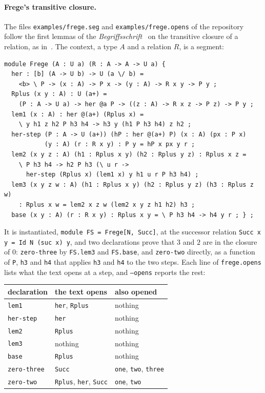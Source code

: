 \documentclass[11pt]{article}
\newcommand{\kw}[1]{\texttt{#1}}
\begin{document}
\paragraph{Frege's transitive closure.} The files
\texttt{examples/frege.seg} and \texttt{examples/frege.opens} of the
repository follow the first lemmas of the
\emph{Begriffsschrift}~\cite{Frege} on the transitive closure of a
relation, as in~\cite[\S2.4.3]{Rem}. The context, a type $A$ and a
relation $R$, is a segment:
\begin{verbatim}
module Frege (A : U a) (R : A -> A -> U a) {
  her : [b] (A -> U b) -> U (a \/ b) =
    <b> \ P -> (x : A) -> P x -> (y : A) -> R x y -> P y ;
  Rplus (x y : A) : U (a+) =
    (P : A -> U a) -> her @a P -> ((z : A) -> R x z -> P z) -> P y ;
  lem1 (x : A) : her @(a+) (Rplus x) =
    \ y h1 z h2 P h3 h4 -> h3 y (h1 P h3 h4) z h2 ;
  her-step (P : A -> U (a+)) (hP : her @(a+) P) (x : A) (px : P x)
           (y : A) (r : R x y) : P y = hP x px y r ;
  lem2 (x y z : A) (h1 : Rplus x y) (h2 : Rplus y z) : Rplus x z =
    \ P h3 h4 -> h2 P h3 (\ u r ->
      her-step (Rplus x) (lem1 x) y h1 u r P h3 h4) ;
  lem3 (x y z w : A) (h1 : Rplus x y) (h2 : Rplus y z) (h3 : Rplus z w)
    : Rplus x w = lem2 x z w (lem2 x y z h1 h2) h3 ;
  base (x y : A) (r : R x y) : Rplus x y = \ P h3 h4 -> h4 y r ; } ;
\end{verbatim}
It is instantiated, \kw{module FS = Frege[N, Succ]}, at the successor
relation \kw{Succ x y = Id N (suc x) y}, and two declarations prove that
$3$ and $2$ are in the closure of $0$: \kw{zero-three} by
\kw{FS.lem3} and \kw{FS.base}, and \kw{zero-two} directly, as a
function of \kw{P}, \kw{h3} and \kw{h4} that applies \kw{h3} and
\kw{h4} to the two steps.
Each line of \texttt{frege.opens} lists what the text opens at a step,
and \kw{--opens} reports the rest:
\begin{center}
\begin{tabular}{lll}
\toprule
declaration & the text opens & also opened\\
\midrule
\kw{lem1} & \kw{her}, \kw{Rplus} & nothing\\
\kw{her-step} & \kw{her} & nothing\\
\kw{lem2} & \kw{Rplus} & nothing\\
\kw{lem3} & nothing & nothing\\
\kw{base} & \kw{Rplus} & nothing\\
\kw{zero-three} & \kw{Succ} & \kw{one}, \kw{two}, \kw{three}\\
\kw{zero-two} & \kw{Rplus}, \kw{her}, \kw{Succ} & \kw{one}, \kw{two}\\
\bottomrule
\end{tabular}
\end{center}
\end{document}
